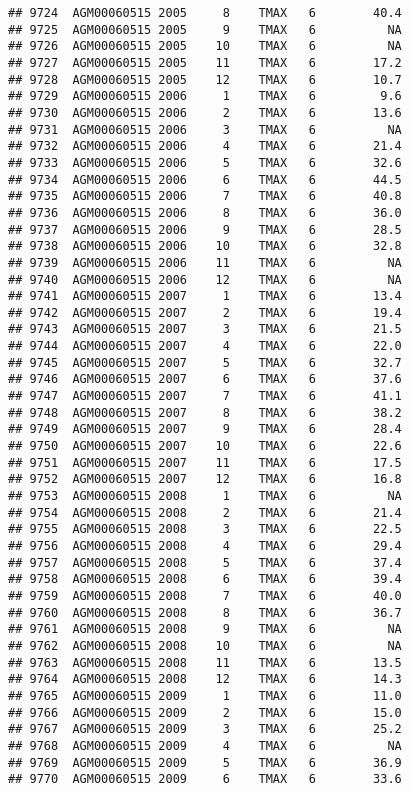 \documentclass{article}\usepackage[]{graphicx}\usepackage[]{color}
\makeatletter
\newenvironment{kframe}{%
 \def\at@end@of@kframe{}%
 \ifinner\ifhmode%
  \def\at@end@of@kframe{\end{minipage}}%
  \begin{minipage}{\columnwidth}%
 \fi\fi%
 \def\FrameCommand##1{\hskip\@totalleftmargin \hskip-\fboxsep
 \colorbox{shadecolor}{##1}\hskip-\fboxsep
     \hskip-\linewidth \hskip-\@totalleftmargin \hskip\columnwidth}%
 \MakeFramed {\advance\hsize-\width
   \@totalleftmargin\z@ \linewidth\hsize
   \@setminipage}}%
 {\par\unskip\endMakeFramed%
 \at@end@of@kframe}
\newenvironment{knitrout}{}{} %
\makeatother
\begin{document}
\begin{knitrout}
\begin{kframe}
\begin{verbatim}
## 9724  AGM00060515 2005     8    TMAX   6        40.4
## 9725  AGM00060515 2005     9    TMAX   6          NA
## 9726  AGM00060515 2005    10    TMAX   6          NA
## 9727  AGM00060515 2005    11    TMAX   6        17.2
## 9728  AGM00060515 2005    12    TMAX   6        10.7
## 9729  AGM00060515 2006     1    TMAX   6         9.6
## 9730  AGM00060515 2006     2    TMAX   6        13.6
## 9731  AGM00060515 2006     3    TMAX   6          NA
## 9732  AGM00060515 2006     4    TMAX   6        21.4
## 9733  AGM00060515 2006     5    TMAX   6        32.6
## 9734  AGM00060515 2006     6    TMAX   6        44.5
## 9735  AGM00060515 2006     7    TMAX   6        40.8
## 9736  AGM00060515 2006     8    TMAX   6        36.0
## 9737  AGM00060515 2006     9    TMAX   6        28.5
## 9738  AGM00060515 2006    10    TMAX   6        32.8
## 9739  AGM00060515 2006    11    TMAX   6          NA
## 9740  AGM00060515 2006    12    TMAX   6          NA
## 9741  AGM00060515 2007     1    TMAX   6        13.4
## 9742  AGM00060515 2007     2    TMAX   6        19.4
## 9743  AGM00060515 2007     3    TMAX   6        21.5
## 9744  AGM00060515 2007     4    TMAX   6        22.0
## 9745  AGM00060515 2007     5    TMAX   6        32.7
## 9746  AGM00060515 2007     6    TMAX   6        37.6
## 9747  AGM00060515 2007     7    TMAX   6        41.1
## 9748  AGM00060515 2007     8    TMAX   6        38.2
## 9749  AGM00060515 2007     9    TMAX   6        28.4
## 9750  AGM00060515 2007    10    TMAX   6        22.6
## 9751  AGM00060515 2007    11    TMAX   6        17.5
## 9752  AGM00060515 2007    12    TMAX   6        16.8
## 9753  AGM00060515 2008     1    TMAX   6          NA
## 9754  AGM00060515 2008     2    TMAX   6        21.4
## 9755  AGM00060515 2008     3    TMAX   6        22.5
## 9756  AGM00060515 2008     4    TMAX   6        29.4
## 9757  AGM00060515 2008     5    TMAX   6        37.4
## 9758  AGM00060515 2008     6    TMAX   6        39.4
## 9759  AGM00060515 2008     7    TMAX   6        40.0
## 9760  AGM00060515 2008     8    TMAX   6        36.7
## 9761  AGM00060515 2008     9    TMAX   6          NA
## 9762  AGM00060515 2008    10    TMAX   6          NA
## 9763  AGM00060515 2008    11    TMAX   6        13.5
## 9764  AGM00060515 2008    12    TMAX   6        14.3
## 9765  AGM00060515 2009     1    TMAX   6        11.0
## 9766  AGM00060515 2009     2    TMAX   6        15.0
## 9767  AGM00060515 2009     3    TMAX   6        25.2
## 9768  AGM00060515 2009     4    TMAX   6          NA
## 9769  AGM00060515 2009     5    TMAX   6        36.9
## 9770  AGM00060515 2009     6    TMAX   6        33.6

\end{verbatim}
\end{kframe}
\end{knitrout}
\end{document}
